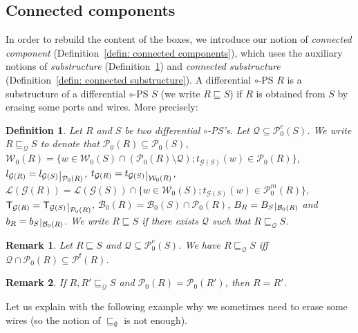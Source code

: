 \documentclass{article}
\newcommand{\target}[1]{t_{#1}}
\theoremstyle{plain}
\newtheorem{definition}{Definition}
\newtheorem{rem}{Remark}
\newcommand{\leftwires}[1]{\mathcal{L}(#1)}
\newcommand{\labelofcell}[1]{l_{#1}}
\newcommand{\groundof}[1]{\mathcal{G}(#1)}
\def\restriction#1#2{\mathchoice
              {\setbox1\hbox{${\displaystyle #1}_{\scriptstyle #2}$}
              \restrictionaux{#1}{#2}}
              {\setbox1\hbox{${\textstyle #1}_{\scriptstyle #2}$}
              \restrictionaux{#1}{#2}}
              {\setbox1\hbox{${\scriptstyle #1}_{\scriptscriptstyle #2}$}
              \restrictionaux{#1}{#2}}
              {\setbox1\hbox{${\scriptscriptstyle #1}_{\scriptscriptstyle #2}$}
              \restrictionaux{#1}{#2}}}
\def\restrictionaux#1#2{{#1\,\smash{\vrule height .8\ht1 depth .85\dp1}}_{\,#2}}
\newcommand{\portsatzero}[1]{\mathcal{P}_0(#1)}
\newcommand{\wiresatzero}[1]{\mathcal{W}_0(#1)}
\newcommand{\conclusions}[1]{\mathcal{P}^{\textsf{f}}(#1)}
\newcommand{\multiplicativeportsatzero}[1]{\mathcal{P}_0^\textit{m}(#1)}
\newcommand{\exponentialportsatzero}[1]{\mathcal{P}_0^\textit{e}(#1)}
\newcommand{\boxesatzero}[1]{\mathcal{B}_{0}(#1)}
\begin{document}
\subsection{Connected components}

In order to rebuild the content of the boxes, we introduce our notion of \emph{connected component} (Definition~\ref{defin: connected components}), which uses the auxiliary notions of \emph{substructure} (Definition~\ref{defin: substructure}) and \emph{connected substructure} (Definition~\ref{defin: connected substructure}). A differential $\circ$-PS $R$ is a substructure of a differential $\circ$-PS $S$ (we write $R \sqsubseteq S$) if $R$ is obtained from $S$ by erasing some ports and wires. More precisely:

\begin{definition}\label{defin: substructure}
Let $R$ and $S$ be two differential $\circ$-PS's. Let $\mathcal{Q} \subseteq \exponentialportsatzero{S}$. We write $R \sqsubseteq_{\mathcal{Q}} S$ to denote that $\portsatzero{R} \subseteq \portsatzero{S}$, $\wiresatzero{R} = \{ w \in \wiresatzero{S} \cap (\portsatzero{R} \setminus \mathcal{Q}) ; \target{\groundof{S}}(w) \in \portsatzero{R} \}$, $\labelofcell{\groundof{R}} = \restriction{\labelofcell{\groundof{S}}}{\portsatzero{R}}$, $\target{\groundof{R}} = \restriction{\target{\groundof{S}}}{\wiresatzero{R}}$, $\leftwires{\groundof{R}} = \leftwires{\groundof{S}} \cap \{ w \in \wiresatzero{S} ; \target{\groundof{S}}(w) \in \multiplicativeportsatzero{R} \}$, $\textsf{T}_{\groundof{R}}= \restriction{\textsf{T}_{\groundof{S}}}{\portsatzero{R}}$, 
$\boxesatzero{R} = \boxesatzero{S} \cap \portsatzero{R}$, $B_R = \restriction{B_S}{\boxesatzero{R}}$ and $b_R = \restriction{b_S}{\boxesatzero{R}}$. We write $R \sqsubseteq S$ if there exists $\mathcal{Q}$ such that $R \sqsubseteq_{\mathcal{Q}} S$.  
\end{definition}

\begin{rem}
Let $R \sqsubseteq S$ and $\mathcal{Q} \subseteq \exponentialportsatzero{S}$. We have $R \sqsubseteq_{\mathcal{Q}} S$ iff $\mathcal{Q} \cap \portsatzero{R} \subseteq \conclusions{R}$.
\end{rem}


\begin{rem}
If $R, R' \sqsubseteq_{\mathcal{Q}} S$ and $\portsatzero{R} = \portsatzero{R'}$, then $R = R'$.
\end{rem}

Let us explain with the following example why we sometimes need to erase some wires (so the notion of $\sqsubseteq_{\emptyset}$ is not enough).  
\end{document}
